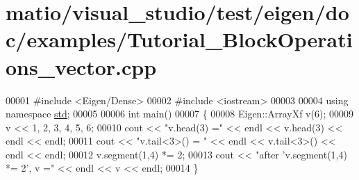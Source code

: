 \hypertarget{matio_2visual__studio_2test_2eigen_2doc_2examples_2_tutorial___block_operations__vector_8cpp_source}{}\section{matio/visual\+\_\+studio/test/eigen/doc/examples/\+Tutorial\+\_\+\+Block\+Operations\+\_\+vector.cpp}
\label{matio_2visual__studio_2test_2eigen_2doc_2examples_2_tutorial___block_operations__vector_8cpp_source}

\begin{DoxyCode}
00001 \textcolor{preprocessor}{#include <Eigen/Dense>}
00002 \textcolor{preprocessor}{#include <iostream>}
00003 
00004 \textcolor{keyword}{using namespace }\hyperlink{namespacestd}{std};
00005 
00006 \textcolor{keywordtype}{int} main()
00007 \{
00008   Eigen::ArrayXf v(6);
00009   v << 1, 2, 3, 4, 5, 6;
00010   cout << \textcolor{stringliteral}{"v.head(3) ="} << endl << v.head(3) << endl << endl;
00011   cout << \textcolor{stringliteral}{"v.tail<3>() = "} << endl << v.tail<3>() << endl << endl;
00012   v.segment(1,4) *= 2;
00013   cout << \textcolor{stringliteral}{"after 'v.segment(1,4) *= 2', v ="} << endl << v << endl;
00014 \}
\end{DoxyCode}

